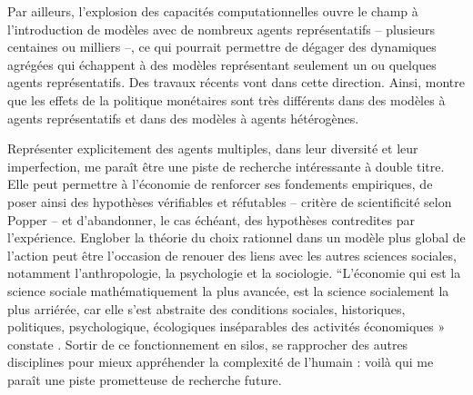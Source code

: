 Par ailleurs, l’explosion des capacités computationnelles ouvre le champ à l’introduction de modèles avec de nombreux agents représentatifs – plusieurs centaines ou milliers –, ce qui pourrait permettre de dégager des dynamiques agrégées qui échappent à des modèles représentant seulement un ou quelques agents représentatifs. Des travaux récents vont dans cette direction. Ainsi, \citet{Kaplan2016} montre que les effets de la politique monétaires sont très différents dans des modèles à agents représentatifs et dans des modèles à agents hétérogènes. 

Représenter explicitement des agents multiples, dans leur diversité et leur imperfection, me paraît être une piste de recherche intéressante à double titre. Elle peut permettre à l’économie de renforcer ses fondements empiriques, de poser ainsi des hypothèses vérifiables et réfutables – critère de scientificité selon Popper – et d’abandonner, le cas échéant, des hypothèses contredites par l’expérience. Englober la théorie du choix rationnel dans un modèle plus global de l’action peut être l’occasion de renouer des liens avec les autres sciences sociales, notamment l’anthropologie, la psychologie et la sociologie. “L'économie qui est la science sociale mathématiquement la plus avancée, est la science socialement la plus arriérée, car elle s'est abstraite des conditions sociales, historiques, politiques, psychologique, écologiques inséparables des activités économiques » constate \citet{Morin1999}. Sortir de ce fonctionnement en silos, se rapprocher des autres disciplines pour mieux appréhender la complexité de l'humain : voilà qui me paraît une piste prometteuse de recherche future.





